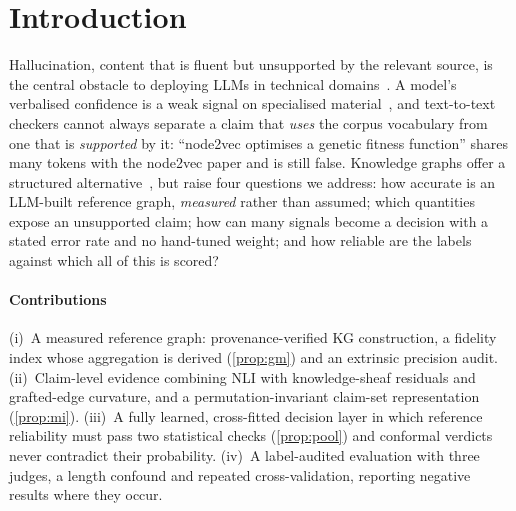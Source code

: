 \documentclass[conference]{IEEEtran}
\begin{document}
\section{Introduction}
Hallucination, content that is fluent but unsupported by the relevant source, is the central obstacle to deploying LLMs
in technical domains~\cite{ji2023survey,huang2025survey}. A model's verbalised confidence is a weak signal on specialised
material~\cite{xiong2024uncertainty,kadavath2022know,tian2023just}, and text-to-text checkers cannot always separate a
claim that \emph{uses} the corpus vocabulary from one that is \emph{supported} by it: ``node2vec optimises a genetic
fitness function'' shares many tokens with the node2vec paper and is still false. Knowledge graphs offer a structured
alternative~\cite{kim2023factkg,sansford2024grapheval}, but raise four questions we address: how accurate is an
LLM-built reference graph, \emph{measured} rather than assumed; which quantities expose an unsupported claim; how can
many signals become a decision with a stated error rate and no hand-tuned weight; and how reliable are the labels
against which all of this is scored?

\paragraph*{Contributions}
(i)~A measured reference graph: provenance-verified KG construction, a fidelity index whose aggregation is derived
(\cref{prop:gm}) and an extrinsic precision audit. (ii)~Claim-level evidence combining NLI with knowledge-sheaf
residuals and grafted-edge curvature, and a permutation-invariant claim-set representation (\cref{prop:mi}).
(iii)~A fully learned, cross-fitted decision layer in which reference reliability must pass two statistical checks
(\cref{prop:pool}) and conformal verdicts never contradict their probability. (iv)~A label-audited evaluation with three
judges, a length confound and repeated cross-validation, reporting negative results where they occur.
\end{document}
